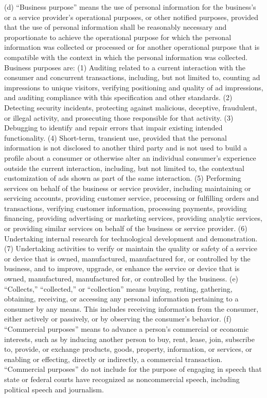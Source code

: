 (d) “Business purpose” means the use of personal information for the business’s or a service provider’s operational purposes, or other notified purposes, provided that the use of personal information shall be reasonably necessary and proportionate to achieve the operational purpose for which the personal information was collected or processed or for another operational purpose that is compatible with the context in which the personal information was collected. Business purposes are:
(1) Auditing related to a current interaction with the consumer and concurrent transactions, including, but not limited to, counting ad impressions to unique visitors, verifying positioning and quality of ad impressions, and auditing compliance with this specification and other standards.
(2) Detecting security incidents, protecting against malicious, deceptive, fraudulent, or illegal activity, and prosecuting those responsible for that activity.
(3) Debugging to identify and repair errors that impair existing intended functionality.
(4) Short-term, transient use, provided that the personal information is not disclosed to another third party and is not used to build a profile about a consumer or otherwise alter an individual consumer’s experience outside the current interaction, including, but not limited to, the contextual customization of ads shown as part of the same interaction.
(5) Performing services on behalf of the business or service provider, including maintaining or servicing accounts, providing customer service, processing or fulfilling orders and transactions, verifying customer information, processing payments, providing financing, providing advertising or marketing services, providing analytic services, or providing similar services on behalf of the business or service provider.
(6) Undertaking internal research for technological development and demonstration.
(7) Undertaking activities to verify or maintain the quality or safety of a service or device that is owned, manufactured, manufactured for, or controlled by the business, and to improve, upgrade, or enhance the service or device that is owned, manufactured, manufactured for, or controlled by the business.
(e) “Collects,” “collected,” or “collection” means buying, renting, gathering, obtaining, receiving, or accessing any personal information pertaining to a consumer by any means. This includes receiving information from the consumer, either actively or passively, or by observing the consumer’s behavior.
(f) “Commercial purposes” means to advance a person’s commercial or economic interests, such as by inducing another person to buy, rent, lease, join, subscribe to, provide, or exchange products, goods, property, information, or services, or enabling or effecting, directly or indirectly, a commercial transaction. “Commercial purposes” do not include for the purpose of engaging in speech that state or federal courts have recognized as noncommercial speech, including political speech and journalism.
